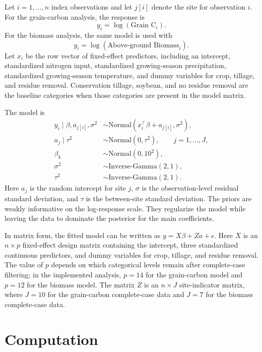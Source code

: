 \documentclass[11pt]{article}
\begin{document}
Let $i=1,\ldots,n$ index observations and let $j[i]$ denote the site for observation $i$. For the grain-carbon analysis, the response is
\[
y_i = \log(\text{Grain C}_{i}).
\]
For the biomass analysis, the same model is used with
\[
y_i = \log(\text{Above-ground Biomass}_{i}).
\]
Let $x_i$ be the row vector of fixed-effect predictors, including an intercept, standardized nitrogen input, standardized growing-season precipitation, standardized growing-season temperature, and dummy variables for crop, tillage, and residue removal. Conservation tillage, soybean, and no residue removal are the baseline categories when those categories are present in the model matrix.

The model is
\begin{align*}
y_i \mid \beta, a_{j[i]}, \sigma^2
  &\sim \text{Normal}(x_i^\top \beta + a_{j[i]}, \sigma^2),\\
a_j \mid \tau^2
  &\sim \text{Normal}(0,\tau^2), \qquad j=1,\ldots,J,\\
\beta_k
  &\sim \text{Normal}(0,10^2),\\
\sigma^2
  &\sim \text{Inverse-Gamma}(2,1),\\
\tau^2
  &\sim \text{Inverse-Gamma}(2,1).
\end{align*}
Here $a_j$ is the random intercept for site $j$, $\sigma$ is the observation-level residual standard deviation, and $\tau$ is the between-site standard deviation. The priors are weakly informative on the log-response scale. They regularize the model while leaving the data to dominate the posterior for the main coefficients.

In matrix form, the fitted model can be written as $y = X\beta + Za + \epsilon$. Here $X$ is an $n \times p$ fixed-effect design matrix containing the intercept, three standardized continuous predictors, and dummy variables for crop, tillage, and residue removal. The value of $p$ depends on which categorical levels remain after complete-case filtering; in the implemented analysis, $p=14$ for the grain-carbon model and $p=12$ for the biomass model. The matrix $Z$ is an $n \times J$ site-indicator matrix, where $J=10$ for the grain-carbon complete-case data and $J=7$ for the biomass complete-case data.

\section{Computation}
\end{document}
